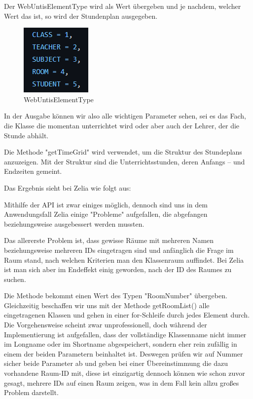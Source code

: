 
Der WebUntisElementType wird als Wert übergeben und je nachdem, welcher Wert das ist, so wird der Stundenplan ausgegeben. 

\begin{figure}[H]
    \centering
    \includegraphics{media/WebUntis/WebUntisElementType.png}
    \caption{WebUntisElementType}
\end{figure}


In der Ausgabe können wir also alle wichtigen Parameter sehen, sei es das Fach, die Klasse die momentan unterrichtet wird oder aber auch der Lehrer, der die Stunde abhält.


Die Methode "getTimeGrid" wird verwendet, um die Struktur des Stundeplans anzuzeigen. Mit der Struktur sind die Unterrichtsstunden, deren Anfangs – und Endzeiten gemeint.


Das Ergebnis sieht bei Zelia wie folgt aus:



Mithilfe der API ist zwar einiges möglich, dennoch sind uns in dem Anwendungsfall Zelia einige "Probleme" aufgefallen, die abgefangen beziehungsweise ausgebessert werden mussten.

Das allererste Problem ist, dass gewisse Räume mit mehreren Namen beziehungsweise mehreren IDs eingetragen sind und anfänglich die Frage im Raum stand, nach welchen Kriterien man den Klassenraum auffindet. Bei Zelia ist man sich aber im Endeffekt einig geworden, nach der ID des Raumes zu suchen.



Die Methode bekommt einen Wert des Typen "RoomNumber" übergeben. Gleichzeitig beschaffen wir uns mit der Methode getRoomList() alle eingetragenen Klassen und gehen in einer for-Schleife durch jedes Element durch. Die Vorgehensweise scheint zwar unprofessionell, doch während der Implementierung ist aufgefallen, dass der vollständige Klassenname nicht immer im Longname oder im Shortname abgespeichert, sondern eher rein zufällig in einem der beiden Parametern beinhaltet ist. Deswegen prüfen wir auf Nummer sicher beide Parameter ab und geben bei einer Übereinstimmung die dazu vorhandene Raum-ID mit, diese ist einzigartig dennoch können wie schon zuvor gesagt, mehrere IDs auf einen Raum zeigen, was in dem Fall kein allzu großes Problem darstellt.

